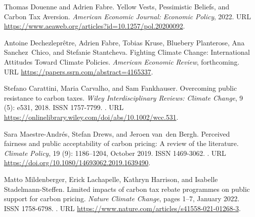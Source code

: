 \begin{thebibliography}{55}
  Thomas Douenne and Adrien Fabre.
  \newblock Yellow {{Vests}}, {{Pessimistic Beliefs}}, and {{Carbon Tax
    Aversion}}.
  \newblock \emph{American Economic Journal: Economic Policy}, 2022.
  \newblock URL \url{https://www.aeaweb.org/articles?id=10.1257/pol.20200092}.
  
  Antoine Dechezlepr{\^e}tre, Adrien Fabre, Tobias Kruse, Bluebery Planterose,
    Ana Sanchez~Chico, and Stefanie Stantcheva.
  \newblock Fighting {{Climate Change}}: {{International Attitudes Toward Climate
    Policies}}.
  \newblock \emph{American Economic Review}, forthcoming.
  \newblock URL \url{https://papers.ssrn.com/abstract=4165337}.
  
  Stefano Carattini, Maria Carvalho, and Sam Fankhauser.
  \newblock Overcoming public resistance to carbon taxes.
  \newblock \emph{Wiley Interdisciplinary Reviews: Climate Change}, 9
    (5): e531, 2018.
  \newblock ISSN 1757-7799.
  \newblock {}.
  \newblock URL \url{https://onlinelibrary.wiley.com/doi/abs/10.1002/wcc.531}.
  
  Sara {Maestre-Andr{\'e}s}, Stefan Drews, and Jeroen van~den Bergh.
  \newblock Perceived fairness and public acceptability of carbon pricing: A
    review of the literature.
  \newblock \emph{Climate Policy}, 19 (9): 1186--1204, October
    2019.
  \newblock ISSN 1469-3062.
  \newblock {}.
  \newblock URL \url{https://doi.org/10.1080/14693062.2019.1639490}.
  
  Matto Mildenberger, Erick Lachapelle, Kathryn Harrison, and Isabelle
    {Stadelmann-Steffen}.
  \newblock Limited impacts of carbon tax rebate programmes on public support for
    carbon pricing.
  \newblock \emph{Nature Climate Change}, pages 1--7, January 2022.
  \newblock ISSN 1758-6798.
  \newblock {}.
  \newblock URL \url{https://www.nature.com/articles/s41558-021-01268-3}.
  

\end{thebibliography}
